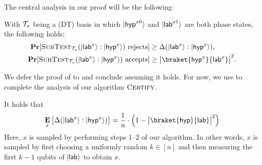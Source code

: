 The central analysis in our proof will be the following:
\begin{theorem} \label{thm:subtest}
        With $\mathcal{T}_x$ being a (DT) basis in which $\lvert\mathsf{hyp}^{x0}\rangle$ and $\lvert\mathsf{lab}^{x1}\rangle$ are both phase states, %
        the following holds:
     \begin{align}
         \Pr[\textsc{SubTest}_{\calT_x}(\ket{\lab^x} : \ket{\smash{\tar^x}}) \text{ rejects}] %
         &\geq \Delta(\ket{\lab^x}: \ket{\tar^x}), \label{eqn:reject}\\
         \Pr[\textsc{SubTest}_{\calT_x}(\ket{\lab^x} : \ket{\tar^x}) \text{ accepts}]
         &\geq \abs{\braket{\tar^x}{\lab^x}}^2. \label{eqn:accept}
     \end{align}
\end{theorem}
We defer the proof of  to  and conclude assuming it holds. For now, we use  to complete the analysis of our algorithm $\textsc{Certify}$. 

\begin{proposition}
    It holds that
    \[
        \mathop{\E}_{x} \sbra{ \Delta(\ket{\lab^x}: \ket{\tar^x}) } = \frac1n\cdot \left(1- \abs{\braket{\tar}{\lab}}^2 \right)
    \]
    Here, $x$ is sampled by performing steps 1--2 of our algorithm. In other words, $x$ is sampled by first choosing a uniformly random $k \in [n]$ and then measuring the first $k-1$ qubits of $\lvert\mathsf{lab}\rangle$ to obtain $x$. 
\end{proposition}

